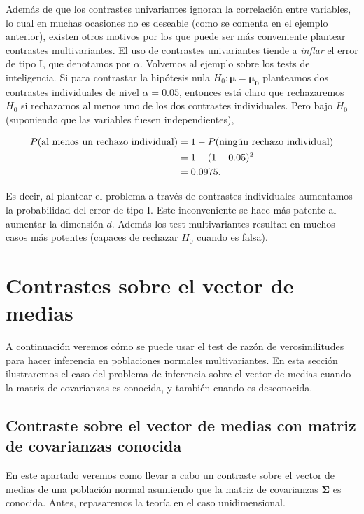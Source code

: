 \documentclass[
  a4paper,
  oneside]{scrbook}
\theoremstyle{definition}
\theoremstyle{definition}
\theoremstyle{definition}
\theoremstyle{definition}
\theoremstyle{remark}
\begin{document}
Además de que los contrastes univariantes ignoran la correlación entre
variables, lo cual en muchas ocasiones no es deseable (como se comenta
en el ejemplo anterior), existen otros motivos por los que puede ser más
conveniente plantear contrastes multivariantes. El uso de contrastes
univariantes tiende a \emph{inflar} el error de tipo I, que denotamos por
\(\alpha\). Volvemos al ejemplo sobre los tests de inteligencia. Si para
contrastar la hipótesis nula \(H_0:\bm{\mu}=\bm{\mu_0}\) planteamos dos
contrastes individuales de nivel \(\alpha=0.05\), entonces está claro que
rechazaremos \(H_0\) si rechazamos al menos uno de los dos contrastes
individuales. Pero bajo \(H_0\) (suponiendo que las variables fuesen
independientes),

\[\begin{aligned}
P(\textnormal{al menos un rechazo individual})&=1-P(\textnormal{ningún rechazo individual})\\
&=1-(1-0.05)^2\\
&=0.0975.\end{aligned}\]

Es decir, al plantear el problema a través de contrastes individuales
aumentamos la probabilidad del error de tipo I. Este inconveniente se
hace más patente al aumentar la dimensión \(d\). Además los test
multivariantes resultan en muchos casos más potentes (capaces de
rechazar \(H_0\) cuando es falsa).

\section{Contrastes sobre el vector de medias}\label{contrastes-sobre-el-vector-de-medias}

A continuación veremos cómo se puede usar el test de razón de
verosimilitudes para hacer inferencia en poblaciones normales
multivariantes. En esta sección ilustraremos el caso del problema de
inferencia sobre el vector de medias cuando la matriz de covarianzas es
conocida, y también cuando es desconocida.

\subsection{Contraste sobre el vector de medias con matriz de covarianzas conocida}\label{contraste-sobre-el-vector-de-medias-con-matriz-de-covarianzas-conocida}

En este apartado veremos como llevar a cabo un contraste sobre el vector
de medias de una población normal asumiendo que la matriz de covarianzas
\(\bm\Sigma\) es conocida. Antes, repasaremos la teoría en el caso
unidimensional.
\end{document}
